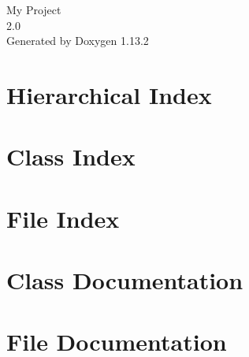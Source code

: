 \documentclass[twoside]{book}
\newcommand{\+}{\discretionary{\mbox{\scriptsize$\hookleftarrow$}}{}{}}
\newcommand{\clearemptydoublepage}{%
    \newpage{\pagestyle{empty}\cleardoublepage}%
  }
\begin{document}
  \raggedbottom
    \hypersetup{pageanchor=false,
                bookmarksnumbered=true,
                pdfencoding=unicode
               }
  \begin{titlepage}
  \vspace*{7cm}
  \begin{center}%
  {\Large My Project}\\
  [1ex]\large 2.\+0 \\
  \vspace*{1cm}
  {\large Generated by Doxygen 1.13.2}\\
  \end{center}
  \end{titlepage}
  \clearemptydoublepage
  \tableofcontents
  \clearemptydoublepage
  \hypersetup{pageanchor=true}

\chapter{Hierarchical Index}

\chapter{Class Index}

\chapter{File Index}

\chapter{Class Documentation}


\chapter{File Documentation}




  \backmatter
  \newpage
  \clearemptydoublepage
  \printindex
\end{document}
